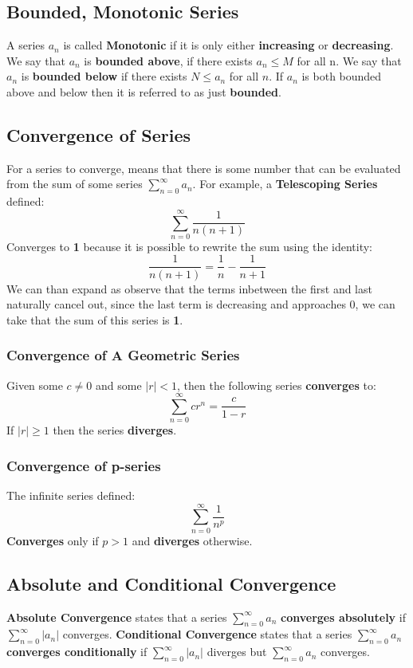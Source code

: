 \documentclass[a4paper]{article}
\begin{document}
  \subsection{Bounded, Monotonic Series}
  A series $a_n$ is called \textbf{Monotonic} if it is only either \textbf{increasing} or \textbf{decreasing}. We say that $a_n$ is \textbf{bounded above}, if there exists $a_n \le M$ for all n. We say that $a_n$ is \textbf{bounded below} if there exists $N \leq a_n$ for all $n$. If $a_n$ is both bounded above and below then it is referred to as just \textbf{bounded}.
  \subsection{Convergence of Series}
  For a series to converge, means that there is some number that can be evaluated from the sum of some series $\sum_{n=0}^\infty a_n$. For example, a \textbf{Telescoping Series} defined:
  \[
    \sum_{n=0}^\infty \displaystyle\frac{1 }{n(n+1)}
  \]
  Converges to \textbf{1} because it is possible to rewrite the sum using the identity:
  \[
    \displaystyle\frac{1 }{n(n+1)} = \displaystyle\frac{1 }{n} - \displaystyle\frac{1 }{n+1}
  \]
  We can than expand as observe that the terms inbetween the first and last naturally cancel out, since the last term is decreasing and approaches 0, we can take that the sum of this series is \textbf{1}. 
  \subsubsection{Convergence of A Geometric Series}
  Given some $c \neq 0$ and some $|r| < 1$, then the following series \textbf{converges} to:
  \[
    \sum_{n=0}^\infty cr^n = \displaystyle\frac{c }{1-r}
  \]
  If $|r| \geq 1$ then the series \textbf{diverges}.
  \subsubsection{Convergence of p-series}
  The infinite series defined:
  \[
    \sum_{n=0}^\infty \displaystyle\frac{1 }{n^p} 
  \]
  \textbf{Converges} only if $p > 1$ and \textbf{diverges} otherwise.
  \subsection{Absolute and Conditional Convergence}
  \textbf{Absolute Convergence} states that a series $\sum_{n=0}^\infty a_n$ \textbf{converges absolutely} if $\sum_{n=0}^\infty |a_n|$ converges. \newline \hfill
  \noindent\textbf{Conditional Convergence} states that a series $\sum_{n=0}^\infty a_n$ \textbf{converges conditionally} if $\sum_{n=0}^\infty |a_n|$ diverges but $\sum_{n=0}^\infty a_n$ converges.
\end{document}
